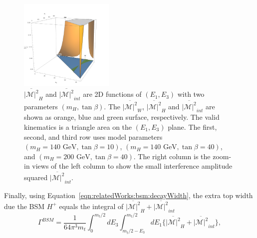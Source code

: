 \begin{figure}[ht]
    \includegraphics[width=0.4\textwidth]{chapters/RelatedWorks/sectionBSM/figures/zoom_2HDM_200_40.png}
    \caption{  $\overline{ |\mathcal{M}|^2 } _{H}$ and $ \overline{ |\mathcal{M}|^2 } _{int}$ are 2D functions of $(E_1, E_3)$ with two parameters $(m_H, \tan\beta)$. The $\overline{ |\mathcal{M}|^2 } _{W}$, $\overline{ |\mathcal{M}|^2 } _{H} $ and $\overline{ |\mathcal{M}|^2 } _{int}$ are shown as orange, blue and green surface, respectively. The valid kinematics is a triangle area on the $(E_1, E_3)$  plane. The first, second, and third row uses model parameters $(m_H = 140 \text{ GeV}, \tan\beta=10)$, $(m_H = 140 \text{ GeV}, \tan\beta=40)$, and $(m_H = 200 \text{ GeV}, \tan\beta=40)$. The right column is the zoom-in views of the left column to show the small interference amplitude squared $ \overline{ |\mathcal{M}|^2 } _{int}$.}
    \label{fig:relatedWorks:bsm:chargedHiggs:m2}
\end{figure}




Finally, using Equation~\ref{eqn:relatedWorks:bsm:decayWidth}, the extra top width due the BSM $H^+$ equals the integral of  $\overline{ |\mathcal{M}|^2 } _{H} +  \overline{ |\mathcal{M}|^2 } _{int}$
\begin{equation}
	\Gamma^{BSM} = \frac{1}{64 \pi^3 m_t} \int_{0}^{m_t/2} dE_3 \int_{m_t/2-E_3}^{m_t/2} dE_1  \bigg\{ \overline{ |\mathcal{M}|^2 } _{H} +  \overline{ |\mathcal{M}|^2}_{int}  \bigg \},
\end{equation}

